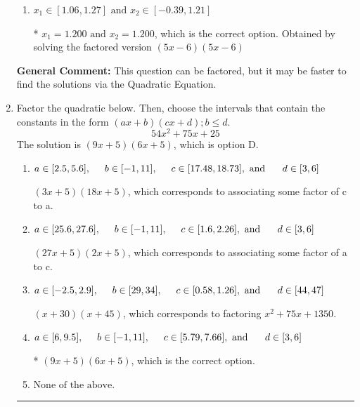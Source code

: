 \documentclass{extbook}[14pt]
\newcommand{\litem}[1]{\item #1

\rule{\textwidth}{0.4pt}}
\begin{document}
\begin{enumerate}
{\begin{enumerate}[label=\Alph*.]
$x_1 = 30.000 \text{ and } x_2 = 30.000$, which corresponds to solving the factored version $(x -30)(x -30)$
\item \( x_1 \in [1.06, 1.27] \text{ and } x_2 \in [-0.39, 1.21] \)

* $x_1 = 1.200 \text{ and } x_2 = 1.200$, which is the correct option. Obtained by solving the factored version $(5x -6)(5x -6)$
\end{enumerate}

\textbf{General Comment:} This question can be factored, but it may be faster to find the solutions via the Quadratic Equation.
}
\litem{
Factor the quadratic below. Then, choose the intervals that contain the constants in the form $(ax+b)(cx+d); b \leq d.$
\[ 54x^{2} +75 x + 25 \]The solution is \( (9x + 5)(6x + 5) \), which is option D.\begin{enumerate}[label=\Alph*.]
\item \( a \in [2.5, 5.6], \hspace*{5mm} b \in [-1, 11], \hspace*{5mm} c \in [17.48, 18.73], \text{ and } \hspace*{5mm} d \in [3, 6] \)

 $(3x + 5)(18x + 5)$, which corresponds to associating some factor of c to a.
\item \( a \in [25.6, 27.6], \hspace*{5mm} b \in [-1, 11], \hspace*{5mm} c \in [1.6, 2.26], \text{ and } \hspace*{5mm} d \in [3, 6] \)

 $(27x + 5)(2x + 5)$, which corresponds to associating some factor of a to c.
\item \( a \in [-2.5, 2.9], \hspace*{5mm} b \in [29, 34], \hspace*{5mm} c \in [0.58, 1.26], \text{ and } \hspace*{5mm} d \in [44, 47] \)

 $(x + 30)(x + 45)$, which corresponds to factoring $x^{2} +75 x + 1350$.
\item \( a \in [6, 9.5], \hspace*{5mm} b \in [-1, 11], \hspace*{5mm} c \in [5.79, 7.66], \text{ and } \hspace*{5mm} d \in [3, 6] \)

* $(9x + 5)(6x + 5)$, which is the correct option.
\item \( \text{None of the above.} \)


\end{enumerate}}
\end{enumerate}
\end{document}
